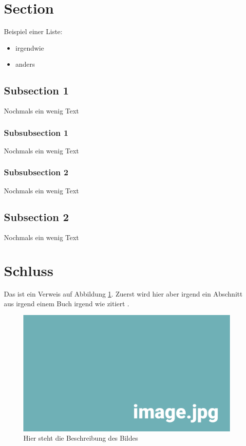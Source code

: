 
\section{Section}

Beispiel einer Liste:

\begin{itemize} 
	\item irgendwie 
	\item anders
\end{itemize}


\subsection{Subsection 1}
Nochmals ein wenig Text

\subsubsection{Subsubsection 1}
Nochmals ein wenig Text

\subsubsection{Subsubsection 2}
Nochmals ein wenig Text

\subsection{Subsection 2}
Nochmals ein wenig Text

\section{Schluss}

Das ist ein Verweis auf Abbildung \ref{pic:DasBild}. Zuerst wird hier aber irgend ein Abschnitt aus irgend einem Buch irgend wie zitiert \parencite[S. 42--66]{plato_staat_2017}. \\

\begin{figure}[htbp]
	\centering

	\includegraphics[width=\textwidth]{img/image.jpg}

	\caption{Hier steht die Beschreibung des Bildes}
	\label{pic:DasBild}
\end{figure}
